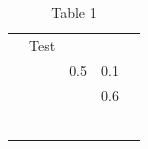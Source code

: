 \documentclass[11pt,a4paper]{article}
\begin{document}
\begin{table}[h]
\caption{Table 1}
\begin{tabular}{|l|l|l|l|l|}
\hline
 &  &  &  &  \\ \hline
 & Test &  &  &  \\ \hline
 &  & 0.5 & 0.1 &  \\ \hline
 &  &  & 0.6 &  \\ \hline
 &  &  &  &  \\ \hline
 &  &  &  &  \\ \hline
 &  &  &  &  \\ \hline
 &  &  &  &  \\ \hline
 &  &  &  &  \\ \hline
 &  &  &  &  \\ \hline
\end{tabular}
\end{table}
\end{document}
